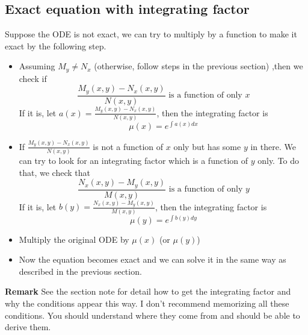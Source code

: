 \documentclass[10pt]{amsart}
\newcommand{\bi}{\begin{itemize}}
\newcommand{\ei}{\end{itemize}}
\renewcommand{\ni}{\noindent}
\newcommand{\tf}{\textbf}
\begin{document}
\subsection*{Exact equation with integrating factor}
Suppose the ODE is not exact, we can try to multiply by a function to make it exact by the following step.
\bi
\item Assuming $M_{y} \neq N_{x}$ (otherwise, follow steps in the previous section) ,then we check if 
$$\frac{M_{y}(x,y)-N_{x}(x,y)}{N(x,y)} \text{ is a function of only }x$$
If it is, let $a(x) = \frac{M_{y}(x,y)-N_{x}(x,y)}{N(x,y)}$, then the integrating factor is
$$ \mu(x) = e^{\int a(x) dx } $$
\item If $ \frac{M_{y}(x,y)-N_{x}(x,y)}{N(x,y)}$ is not a function of $x$ only but has some $y$ in there. We can try to look for an integrating factor which is a function of $y$ only. To do that, we check that
$$\frac{N_{x}(x,y)-M_{y}(x,y)}{M(x,y)} \text{ is a function of only }y$$
If it is, let $b(y) = \frac{N_{x}(x,y)-M_{y}(x,y)}{M(x,y)}$, then the integrating factor is
$$ \mu(y) = e^{\int b(y) dy } $$
\item Multiply the original ODE by $\mu(x)$ (or $\mu(y)$)
\item Now the equation becomes exact and we can solve it in the same way as described in the previous section.
\ei 
\ni\tf{Remark} See the section note for detail how to get the integrating factor and why the conditions appear this way. I don't recommend memorizing all these conditions. You should understand where they come from and should be able to derive them. 






 
\end{document}
